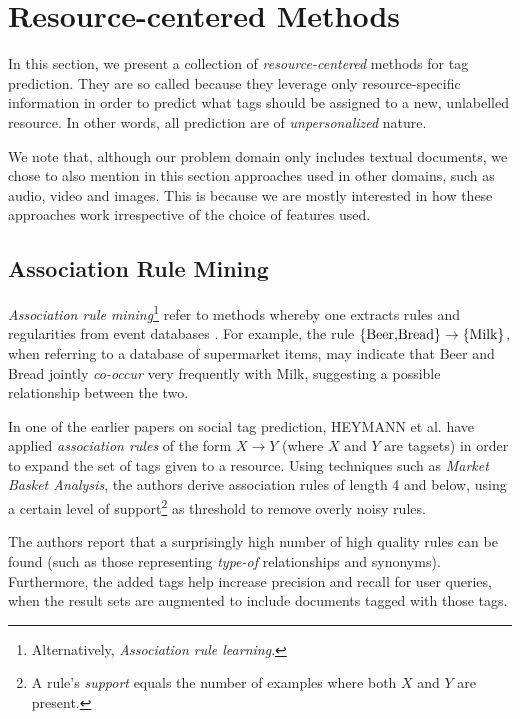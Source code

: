 \section{Resource-centered Methods}\label{section:resource_centered_methods}

In this section, we present a collection of  \textit{resource-centered} methods for tag prediction. They are so called because they leverage only resource-specific information in order to predict what tags should be assigned to a new, unlabelled resource. In other words, all prediction are of \textit{unpersonalized} nature.

We note that, although our problem domain only includes textual documents, we chose to also mention in this section approaches used in other domains, such as audio, video and images. This is because we are mostly interested in how these approaches work irrespective of the choice of features used.

\subsection{Association Rule Mining}

\textit{Association rule mining}\footnote{Alternatively, \textit{Association rule learning}.} refer to methods whereby one extracts rules and regularities from event databases \citep{agrawal_etal_93}. For example, the rule $\{\textnormal{Beer,Bread}\} \rightarrow \{\textnormal{Milk}\}$, when referring to a database of supermarket items, may indicate that Beer and Bread jointly \textit{co-occur} very frequently with Milk, suggesting a possible relationship between the two.

In one of the earlier papers on social tag prediction, HEYMANN et al. \citeyearpar{heymann_etal_2008} have applied \textit{association rules} of the form $X \rightarrow Y$ (where $X$ and $Y$ are tagsets) in order to expand the set of tags given to a resource. Using techniques such as \textit{Market Basket Analysis}, the authors derive association rules of length 4 and below, using a certain level of support\footnote{A rule's \textit{support} equals the number of examples where both $X$ and $Y$ are present.} as threshold to remove overly noisy rules.

The authors report \citep{heymann_etal_2008} that a surprisingly high number of high quality rules can be found (such as those representing \textit{type-of} relationships and synonyms). Furthermore, the added tags help increase precision and recall for user queries, when the result sets are augmented to include documents tagged with those tags.

